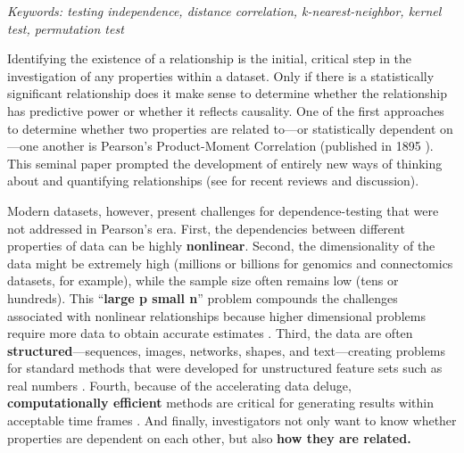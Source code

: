\documentclass[11pt]{article}
\begin{document}
\noindent%
{\it Keywords: testing independence, distance correlation, k-nearest-neighbor, kernel test, permutation test}

\clearpage
\setcounter{tocdepth}{2}


Identifying the existence of a relationship is the initial, critical step in the investigation of any properties within a dataset. Only if there is a statistically significant relationship does it make sense to determine whether the relationship has predictive power or whether it reflects causality.
One of the first approaches to determine whether two properties are related to---or statistically dependent on---one another is Pearson's Product-Moment Correlation (published in 1895 \cite{Pearson1895}). This seminal paper prompted the development of  entirely new ways of thinking about and quantifying relationships (see \cite{Reimherr2013,JosseHolmes2013} for  recent reviews and discussion).


Modern datasets, however, present  challenges for dependence-testing that were not addressed in Pearson's era.
%
First, the dependencies between different properties 
of data can be highly \textbf{nonlinear}.
% 
Second, the dimensionality of the data might be extremely high (millions or billions for genomics and connectomics datasets, for example), while the sample size often remains low (tens or hundreds).  This ``\textbf{large p small n}'' problem compounds the challenges associated with nonlinear relationships because higher dimensional problems require more data to obtain accurate estimates \cite{johnstone2009statistical}.
Third, the data are often \textbf{structured}---sequences, images, networks, shapes, and text---creating problems for standard methods that were developed for unstructured feature sets such as real numbers \cite{bakir2007predicting}.
Fourth, because of the accelerating data deluge,  \textbf{computationally efficient} methods are critical for generating results within acceptable time frames \cite{hey2009fourth}.
And finally, investigators not only want to know {whether}  properties are dependent on each other, but also \textbf{how they are related.}
\end{document}
